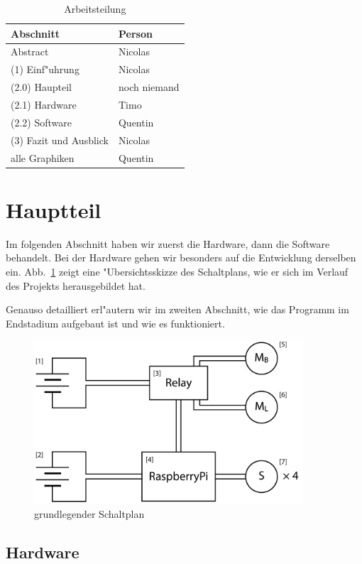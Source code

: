 \documentclass[a4paper,12pt]{article}
\begin{document}
\begin{table}[h]
	\centering
	\begin{tabular}{|l|l|}
	\hline
		Abschnitt & Person \\ \hline
		Abstract & Nicolas \\
		(1) Einf"uhrung & Nicolas \\
		(2.0) Haupteil & noch niemand \\
		(2.1) Hardware & Timo \\
		(2.2) Software & Quentin \\
		(3) Fazit und Ausblick & Nicolas \\
		alle Graphiken & Quentin \\
	\hline
	\end{tabular}
	\caption{Arbeitsteilung}
	\label{Tab1}
\end{table}

\section{Hauptteil}\label{sec2}

Im folgenden Abschnitt haben wir zuerst die Hardware, dann die Software behandelt.
Bei der Hardware gehen wir besonders auf die Entwicklung derselben ein.
Abb.~\ref{Fig2} zeigt eine "Ubersichtsskizze des Schaltplans, wie er sich im Verlauf des Projekts herausgebildet hat.

Genauso detailliert erl"autern wir im zweiten Abschnitt, wie das Programm im Endstadium aufgebaut ist und wie es funktioniert.

\begin{figure}[h]
	\centering
	\includegraphics[width=10cm]{./media/circuit_general.png}
	\caption{grundlegender Schaltplan}
	\label{Fig2}
\end{figure}

\subsection{Hardware}\label{sec2.1}
\end{document}

